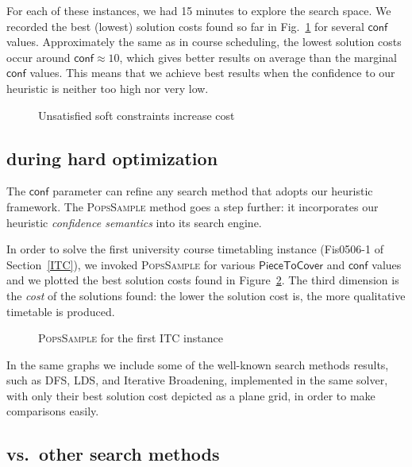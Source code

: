 \documentclass{ws-ijait}
\begin{document}
For each of these instances, we had 15 minutes to explore
the search space. We recorded the best (lowest) solution
costs found so far in Fig.~\ref{CELAR} for several
$\mathsf{conf}$ values. Approximately the same as in course
scheduling, the lowest solution costs occur around
$\mathsf{conf} \approx 10$, which gives better results on
average than the marginal $\mathsf{conf}$ values. This means
that we achieve best results when the confidence to our
heuristic is neither too high nor very low.

\begin{figure}
  \centering
  
  \caption{Unsatisfied soft constraints increase
           cost\label{CELAR}}
\end{figure}

\subsection{\PopsSample{} during hard optimization}

The $\mathsf{conf}$ parameter can refine any search method
that adopts our heuristic framework. The \textsc{PopsSample}
method goes a step further: it incorporates our heuristic
\emph{confidence semantics} into its search engine.

In order to solve the first university course timetabling
instance (\textsf{Fis0506-1} of Section~\ref{ITC}), we
invoked \textsc{PopsSample} for various
$\mathsf{PieceToCover}$ and $\mathsf{conf}$ values and we
plotted the best solution costs found in Figure~\ref{ITC1}.
The third dimension is the \emph{cost} of the solutions
found: the lower the solution cost is, the more qualitative
timetable is produced.

\begin{figure}
  \centering
  
  \caption{{\normalfont\textsc{PopsSample}} for the first
           ITC instance\label{ITC1}}
\end{figure}

In the same graphs we include some of the well-known search
methods results, such as DFS, LDS, and Iterative Broadening,
implemented in the same solver, with only their best
solution cost depicted as a plane grid, in order to make
comparisons easily.

\subsection{\PoPS{} vs.\ other search methods}
\end{document}
